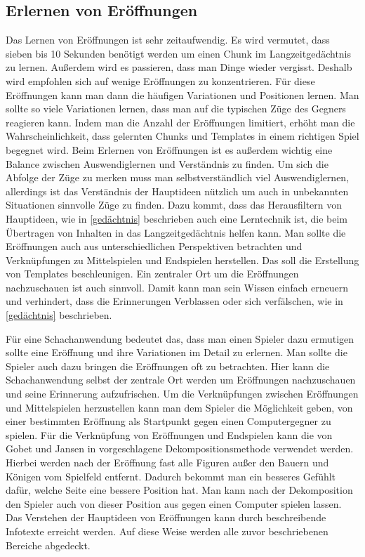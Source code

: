 \subsection{Erlernen von Eröffnungen}
Das Lernen von Eröffnungen ist sehr zeitaufwendig. Es wird vermutet, dass sieben bis 10 Sekunden benötigt werden um einen Chunk im Langzeitgedächtnis zu lernen. Außerdem wird es passieren, dass man Dinge wieder vergisst. Deshalb wird empfohlen sich auf wenige Eröffnungen zu konzentrieren. Für diese Eröffnungen kann man dann die häufigen Variationen und Positionen lernen. Man sollte so viele Variationen lernen, dass man auf die typischen Züge des Gegners reagieren kann. Indem man die Anzahl der Eröffnungen limitiert, erhöht man die Wahrscheinlichkeit, dass gelernten Chunks und Templates in einem richtigen Spiel begegnet wird. Beim Erlernen von Eröffnungen ist es außerdem wichtig eine Balance zwischen Auswendiglernen und Verständnis zu finden. Um sich die Abfolge der Züge zu merken muss man selbstverständlich viel Auswendiglernen, allerdings ist das Verständnis der Hauptideen nützlich um auch in unbekannten Situationen sinnvolle Züge zu finden. Dazu kommt, dass das Herausfiltern von Hauptideen, wie in \autoref{gedächtnis} beschrieben auch eine Lerntechnik ist, die beim Übertragen von Inhalten in das Langzeitgedächtnis helfen kann. Man sollte die Eröffnungen auch aus unterschiedlichen Perspektiven betrachten und Verknüpfungen zu Mittelspielen und Endspielen herstellen. Das soll die Erstellung von Templates beschleunigen. Ein zentraler Ort um die Eröffnungen nachzuschauen ist auch sinnvoll. Damit kann man sein Wissen einfach erneuern und verhindert, dass die Erinnerungen Verblassen oder sich verfälschen, wie in \autoref{gedächtnis} beschrieben.
\cite{gobet_training_2006}

Für eine Schachanwendung bedeutet das, dass man einen Spieler dazu ermutigen sollte eine Eröffnung und ihre Variationen im Detail zu erlernen. Man sollte die Spieler auch dazu bringen die Eröffnungen oft zu betrachten. Hier kann die Schachanwendung selbst der zentrale Ort werden um Eröffnungen nachzuschauen und seine Erinnerung aufzufrischen. Um die Verknüpfungen zwischen Eröffnungen und Mittelspielen herzustellen kann man dem Spieler die Möglichkeit geben, von einer bestimmten Eröffnung als Startpunkt gegen einen Computergegner zu spielen. Für die Verknüpfung von Eröffnungen und Endspielen kann die von Gobet und Jansen in \cite{gobet_training_2006} vorgeschlagene Dekompositionsmethode verwendet werden. Hierbei werden nach der Eröffnung fast alle Figuren außer den Bauern und Königen vom Spielfeld entfernt. Dadurch bekommt man ein besseres Gefühlt dafür, welche Seite eine bessere Position hat. Man kann nach der Dekomposition den Spieler auch von dieser Position aus gegen einen Computer spielen lassen. Das Verstehen der Hauptideen von Eröffnungen kann durch beschreibende Infotexte erreicht werden. Auf diese Weise werden alle zuvor beschriebenen Bereiche abgedeckt. 

